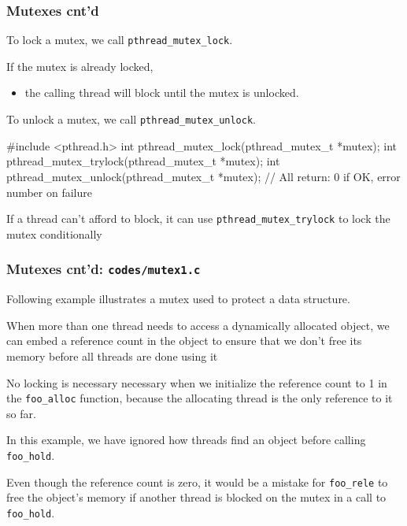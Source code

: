 \documentclass[newPxFont,sthlmFooter,nooffset]{beamer}
\begin{document}
\begin{frame}[fragile,t]
  \frametitle{Mutexes cnt'd}
To lock a mutex, we call \texttt{pthread\_mutex\_lock}.

If the mutex is already locked,
\begin{itemize}
\item the calling thread will block until the mutex is unlocked.
\end{itemize}
To unlock a mutex, we call \texttt{pthread\_mutex\_unlock}.
\begin{codedef}
#include <pthread.h>
int pthread_mutex_lock(pthread_mutex_t *mutex);
int pthread_mutex_trylock(pthread_mutex_t *mutex);
int pthread_mutex_unlock(pthread_mutex_t *mutex);
// All return: 0 if OK, error number on failure
\end{codedef}
If a thread can’t afford to block, it can use \texttt{pthread\_mutex\_trylock} to lock the mutex conditionally

\end{frame}

\begin{frame}
  \frametitle{Mutexes cnt'd: \texttt{codes/mutex1.c}}
Following example illustrates a mutex used to protect a data structure.

When more than one thread needs to access a dynamically allocated object, we can embed a reference count in the object to ensure that we don’t free its memory before all threads are done using it



No locking is necessary necessary when we initialize the reference count to 1 in the \texttt{foo\_alloc} function, because the allocating thread is the only reference to it so far.

In this example, we have ignored how threads find an object before calling \texttt{foo\_hold}.

Even though the reference count is zero, it would be a mistake for \texttt{foo\_rele} to free the object’s memory if another thread is blocked on the mutex in a call to \texttt{foo\_hold}.
\end{frame}
\end{document}
